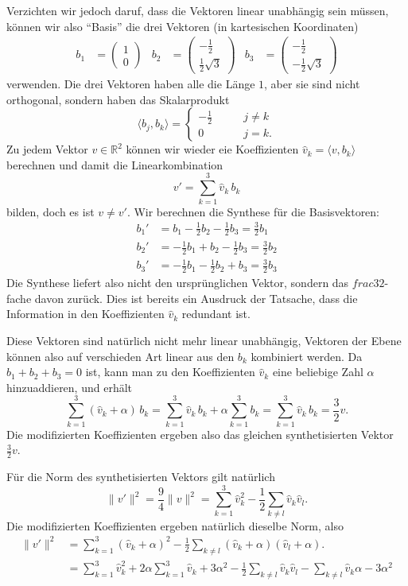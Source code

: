 Verzichten wir jedoch daruf, dass die Vektoren linear unabhängig sein müssen,
können wir also ``Basis'' die drei Vektoren (in kartesischen Koordinaten)
\begin{align*}
b_1
&=
\begin{pmatrix}1\\0\end{pmatrix}
&
b_2
&=
\begin{pmatrix}-\frac12\\\frac12\sqrt{3}\end{pmatrix}
&
b_3
&=
\begin{pmatrix}-\frac12\\-\frac12\sqrt{3}\end{pmatrix}
\end{align*}
verwenden.
Die drei Vektoren haben alle die Länge $1$, aber sie sind nicht
orthogonal, sondern haben das Skalarprodukt
\[
\langle b_j,b_k\rangle
=
\begin{cases}
-\frac12&\qquad j\ne k\\
0&\qquad j=k.
\end{cases}
\]
Zu jedem Vektor $v\in\mathbb R^2$ können wir wieder eie Koeffizienten
$\hat{v}_k=\langle v,b_k\rangle$ berechnen und damit die Linearkombination
\[
v' = \sum_{k=1}^3 \hat{v}_k\,b_k
\]
bilden,
doch es ist $v\ne v'$.
Wir berechnen die Synthese für die Basisvektoren:
\begin{align*}
b_1'
&=
b_1 - \frac12 b_2 - \frac 12 b_3
=
\frac32b_1
\\
b_2'
&=
-\frac12 b_1 + b_2 -\frac12 b_3
=
\frac32b_2
\\
b_3'
&=
-\frac12b_1-\frac12 b_2 + b_3
=
\frac32b_3
\end{align*}
Die Synthese liefert also nicht den ursprünglichen Vektor, sondern das
$frac32$-fache davon zurück.
Dies ist bereits ein Ausdruck der Tatsache, dass die Information in den
Koeffizienten $\hat{v}_k$ redundant ist.

Diese Vektoren sind natürlich nicht mehr linear unabhängig, Vektoren
der Ebene können also auf verschieden Art linear aus den $b_k$ kombiniert
werden.
Da $b_1+b_2+b_3=0$ ist, kann man zu den Koeffizienten $\hat{v}_k$
eine beliebige Zahl $\alpha$ hinzuaddieren, und erhält
\[
\sum_{k=1}^3 (\hat{v}_k+\alpha)\, b_k
=
\sum_{k=1}^3 \hat{v}_k\,b_k
+\alpha
\sum_{k=1}^3 b_k
=
\sum_{k=1}^3 \hat{v}_k\,b_k
=
\frac32 v.
\]
Die modifizierten Koeffizienten ergeben also das gleichen synthetisierten
Vektor $\frac32 v$.

Für die Norm des synthetisierten Vektors gilt natürlich
\[
\|v'\|^2
=
\frac94\|v\|^2
=
\sum_{k=1}^3 \hat{v}_k^2 
-
\frac12\sum_{k\ne l} \hat{v}_k\hat{v}_l.
\]
Die modifizierten Koeffizienten ergeben natürlich dieselbe Norm, also
\begin{align*}
\|v'\|^2
&=
\sum_{k=1}^3 (\hat{v}_k+\alpha)^2 
-
\frac12\sum_{k\ne l} (\hat{v}_k+\alpha)(\hat{v}_l+\alpha).
\\
&=
\sum_{k=1}^3 \hat{v}_k^2
+2\alpha \sum_{k=1}^3 \hat{v}_k
+3\alpha^2
-
\frac12\sum_{k\ne l} \hat{v}_k\hat{v}_l
-
\sum_{k\ne l} \hat{v}_k \alpha
-
3\alpha^2
\end{align*}


